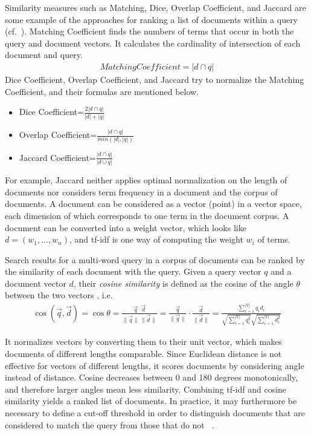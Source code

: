 \documentclass{IOS-Book-Article}
\begin{document}
Similarity measures such as Matching, Dice, Overlap Coefficient, and Jaccard are some example of the approaches for ranking a list of documents within a query (cf.~\citet{ChristopherD1999}).
Matching Coefficient finds the numbers of terms that occur in both the query and document vectors. It calculates the cardinality of intersection of each document and query.
\begin{align*}
\mathit{Matching Coefficient}=|d\cap q|
\end{align*}
Dice Coefficient, Overlap Coefficient, and Jaccard try to normalize the Matching Coefficient, and their formulas are mentioned below.
\begin{itemize}
	\item Dice Coefficient=$\frac{2|d\cap q|}{|d|+|q|}$
	\item Overlap Coefficient=$\frac{|d\cap q|}{min(|d|,|q|)}$
	\item Jaccard Coefficient=$\frac{|d\cap q|}{|d\cup q|}$
\end{itemize}
For example, Jaccard neither applies optimal normalization on the length of documents nor considers term frequency in a document and the corpus of documents.
A document can be considered as a vector (point) in a vector space, each dimension of which corresponds to one term in the document corpus. A document can be converted into a weight vector, which looks like $d=(w_1,\dots,w_n)$, and tf-idf is one way of computing the weight $w_i$ of terms.

Search results for a multi-word query in a corpus of documents can be ranked by the similarity of each document with the query. Given a query vector $q$ and a document vector $d$, their \emph{cosine similarity} is defined as the cosine of the angle $\theta$ between the two vectors \citep{SALTON1988,ChristopherD1999}, i.e.\
\begin{align*}
\operatorname{\cos}(\overrightarrow{q},\overrightarrow{d})=\cos \theta=\frac{\overrightarrow{q}\cdot \overrightarrow{d}}{\|\overrightarrow{q}\|\,\|\overrightarrow{d}\|}=\frac{\overrightarrow{q}}{\|\overrightarrow{q}\|}\cdot \frac{\overrightarrow{d}}{\|\overrightarrow{d}\|}=\frac{\sum_{i=1}^{|V|} q_id_i}{\sqrt{\sum_{i=1}^{|V|} q_i^2}\sqrt{\sum_{i=1}^{|V|} d_i^2}}
\end{align*}

It normalizes vectors by converting them to their unit vector, which makes documents of different lengths comparable. Since Euclidean distance is not effective for vectors of different lengths, it scores documents by considering angle instead of distance. Cosine decreases between 0 and 180 degrees monotonically, and therefore larger angles mean less similarity. 
Combining tf-idf and cosine similarity yields a ranked list of documents. In practice, it may furthermore be necessary to define a cut-off threshold in order to distinguish documents that are considered to match the query from those that do not~ \citep{Joachims1997}.
\end{document}
